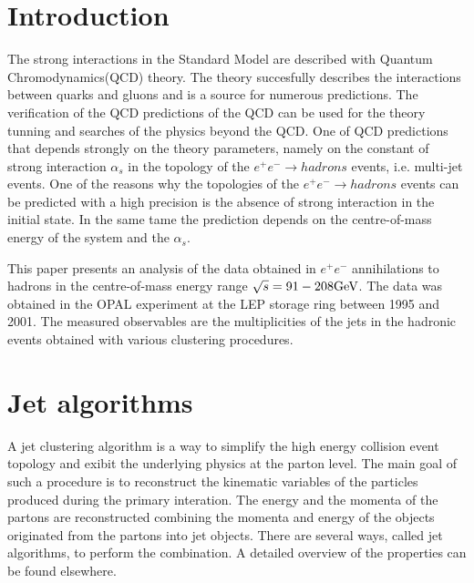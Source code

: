 \newpage
\section{Introduction}
\label{sec:introduction}
The strong interactions  in the Standard Model are described 
with Quantum Chromodynamics(QCD) theory. 
The theory succesfully describes 
the interactions between quarks and gluons and is a source for numerous 
predictions. The verification of the QCD predictions of the QCD can
be used for the theory tunning and searches of the physics beyond the 
QCD.
One of QCD predictions that depends strongly on the theory parameters, namely on the constant of strong interaction $\alpha_s$ 
in the topology of the $e^+e^-\rightarrow hadrons$ events, i.e. multi-jet events. One of the reasons why the
topologies of the $e^+e^-\rightarrow hadrons$ events can be predicted with a high
precision is the absence of  strong interaction in the initial state. In the same tame the prediction depends on the 
centre-of-mass energy of the system and the $\alpha_s$.




This paper presents an analysis of the data obtained in $e^+e^-$ 
annihilations to hadrons in the centre-of-mass energy range 
$\sqrt{s}=91-208{\text{Ge}\kern-0.06667em\text{V\/}}$. The data was obtained in the OPAL experiment 
at the LEP storage ring between 1995 and  2001. 
The measured observables are the multiplicities of the jets in the 
hadronic events obtained with various clustering procedures.


\section{Jet algorithms}
\label{sec:algorithms}
A jet clustering algorithm is a way to simplify the high energy collision event topology 
 and exibit the underlying physics at the parton level. The main goal of such a procedure is to
 reconstruct the kinematic variables of the particles produced during the primary interation.
 The energy and the momenta of the partons are reconstructed combining the 
 momenta and energy of the objects originated from the partons into jet objects.
 There are several ways, called jet algorithms,
  to perform the combination. A detailed overview of the properties can be found elsewhere.
 
 
 


